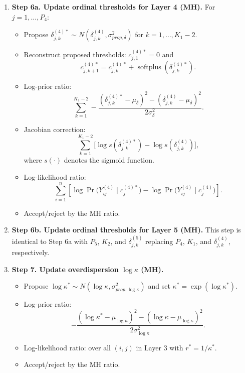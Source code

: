 \documentclass[11pt]{article}
\begin{document}
\begin{enumerate}[leftmargin=1.8em]
    \item \textbf{Step 6a. Update ordinal thresholds for Layer 4 (MH).}
    For $j=1,\dots,P_4$:
    \begin{itemize}[leftmargin=1.5em]
        \item Propose $\delta_{j,k}^{(4)*}\sim N(\delta_{j,k}^{(4)},\sigma_{prop,\delta}^2)$ for $k=1,\dots,K_1-2$.
        \item Reconstruct proposed thresholds: $c_{j,1}^{(4)*}=0$ and
        \[
        c_{j,k+1}^{(4)*}=c_{j,k}^{(4)*}+\operatorname{softplus}(\delta_{j,k}^{(4)*}).
        \]
        \item Log-prior ratio:
        \[
        \sum_{k=1}^{K_1-2}
        -\frac{(\delta_{j,k}^{(4)*}-\mu_\delta)^2-(\delta_{j,k}^{(4)}-\mu_\delta)^2}{2\sigma_\delta^2}.
        \]
        \item Jacobian correction:
        \[
        \sum_{k=1}^{K_1-2}\bigl[\log s(\delta_{j,k}^{(4)*})-\log s(\delta_{j,k}^{(4)})\bigr],
        \]
        where $s(\cdot)$ denotes the sigmoid function.
        \item Log-likelihood ratio:
        \[
        \sum_{i=1}^{n}\left[\log \Pr\bigl(Y_{ij}^{(4)}\mid c_j^{(4)*}\bigr)-\log \Pr\bigl(Y_{ij}^{(4)}\mid c_j^{(4)}\bigr)\right].
        \]
        \item Accept/reject by the MH ratio.
    \end{itemize}

    \item \textbf{Step 6b. Update ordinal thresholds for Layer 5 (MH).}
    This step is identical to Step 6a with $P_5$, $K_2$, and $\delta_{j,k}^{(5)}$ replacing $P_4$, $K_1$, and $\delta_{j,k}^{(4)}$, respectively.

    \item \textbf{Step 7. Update overdispersion $\log \kappa$ (MH).}
    \begin{itemize}[leftmargin=1.5em]
        \item Propose $\log \kappa^*\sim N(\log \kappa,\sigma_{prop,\log \kappa}^2)$ and set $\kappa^*=\exp(\log \kappa^*)$.
        \item Log-prior ratio:
        \[
        -\frac{(\log \kappa^*-\mu_{\log \kappa})^2-(\log \kappa-\mu_{\log \kappa})^2}{2\sigma_{\log \kappa}^2}.
        \]
        \item Log-likelihood ratio: over all $(i,j)$ in Layer 3 with $r^*=1/\kappa^*$.
        \item Accept/reject by the MH ratio.
    \end{itemize}


\end{enumerate}
\end{document}
